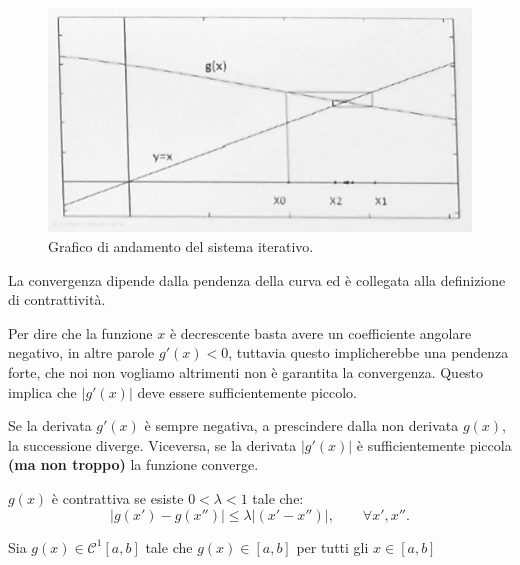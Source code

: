 \newpage
\begin{figure}[h!]
    \centering 
    \includegraphics[width=1\textwidth]{Esterni/Altro/imgs/20250226_091358.jpg} 
    \caption{Grafico di andamento del sistema iterativo.} 
    \label{fig:grafico_andamento_sistema_iterativo} 
\end{figure}

\begin{notion}
    La convergenza dipende dalla pendenza della curva ed è collegata alla definizione di contrattività.
\end{notion}
Per dire che la funzione $x$ è decrescente basta avere un coefficiente angolare negativo, in altre parole $g'(x) < 0$, tuttavia questo implicherebbe una pendenza forte, che noi non vogliamo altrimenti non è garantita la convergenza.
Questo implica che $|g'(x)|$ deve essere sufficientemente piccolo.
\newline
\begin{notion}
    Se la derivata $g'(x)$ è sempre negativa, a prescindere dalla non derivata $g(x)$, la successione diverge.
    \newline
    Viceversa, se la derivata $|g'(x)|$ è sufficientemente piccola \textbf{(ma non troppo)} la funzione converge.    
\end{notion}
\begin{definition}
    $\mathit{g}(x)$ è contrattiva se esiste $0 < \lambda < 1$ tale che:
    \begin{equation}
        |g(x')-g(x'')|\leq \lambda|(x' - x'')|, \qquad \forall x',x''.        
    \end{equation}
\end{definition}
\begin{theorem}
    Sia $\mathit{g}(x)\in \mathcal{C}^1[a,b]$ tale che $\mathit{g}(x) \in [a,b]$ per tutti gli $x \in [a,b]$
\end{theorem}

